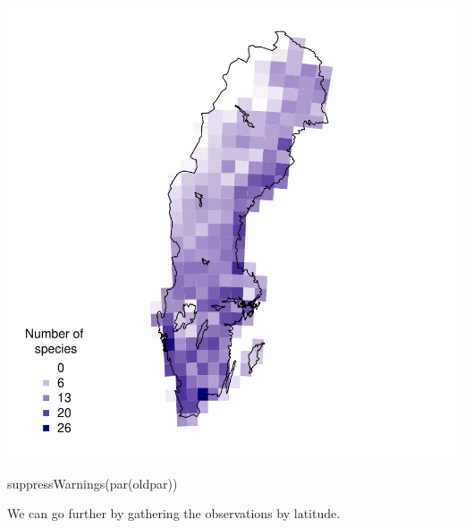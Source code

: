\documentclass[
  10pt,
]{article}
\newenvironment{Shaded}{\begin{snugshade}}{\end{snugshade}}
\newcommand{\FunctionTok}[1]{\textcolor[rgb]{0.00,0.00,0.00}{#1}}
\newcommand{\NormalTok}[1]{#1}
\begin{document}
\includegraphics{r-tools-tutorial_files/figure-latex/grid-1.pdf}

\begin{Shaded}
\begin{Highlighting}[]
\FunctionTok{suppressWarnings}\NormalTok{(}\FunctionTok{par}\NormalTok{(oldpar))}
\end{Highlighting}
\end{Shaded}

We can go further by gathering the observations by latitude.
\end{document}
